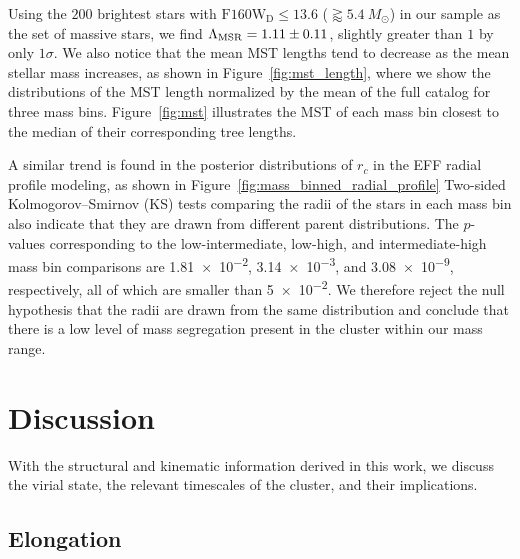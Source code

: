 \documentclass[12pt]{ucsddissertation}
\begin{document}
\begin{CJK*}{UTF8}{gbsn}
Using the $200$ brightest stars with $\mathrm{F160W}_\mathrm{D} \leq 13.6$ ($\gtrapprox5.4~M_\odot$) in our sample as the set of massive stars, we find $\rm \Lambda_{\rm MSR} = 1.11\pm0.11$, slightly greater than $1$ by only $1\sigma$. We also notice that the mean MST lengths tend to decrease as the mean stellar mass increases, as shown in Figure~\ref{fig:mst_length}, where we show the distributions of the MST length normalized by the mean of the full catalog for three mass bins. Figure~\ref{fig:mst} illustrates the MST of each mass bin closest to the median of their corresponding tree lengths.

A similar trend is found in the posterior distributions of $r_c$ in the EFF radial profile modeling, as shown in Figure~\ref{fig:mass_binned_radial_profile} Two-sided Kolmogorov--Smirnov (KS) tests comparing the radii of the stars in each mass bin also indicate that they are drawn from different parent distributions. The $p$-values corresponding to the low-intermediate, low-high, and intermediate-high mass bin comparisons are \num{1.81e-2}, \num{3.14e-3}, and \num{3.08e-9}, respectively, all of which are smaller than \num[]{5e-2}. We therefore reject the null hypothesis that the radii are drawn from the same distribution and conclude that there is a low level of mass segregation present in the cluster within our mass range.


\section{Discussion}
\label{wd1-sec:discussion}
With the structural and kinematic information derived in this work, we discuss the virial state, the relevant timescales of the cluster, and their implications.

\subsection{Elongation}
\label{wd1-subsec:elongation}


\end{CJK*}
\end{document}
